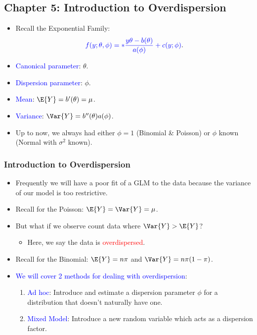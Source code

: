 \documentclass[oneside]{book}\usepackage[]{graphicx}\usepackage[svgnames]{xcolor}
\let\exp\relax%
\begin{document}
\subsection*{Chapter 5: Introduction to Overdispersion}
\begin{itemize}
    \item Recall the Exponential Family:
          \[ \textcolor{Blue}{ f(y;\theta,\phi)=\exp*{\frac{y\theta-b(\theta)}{a(\phi)}+c(y;\phi)} }. \]
    \item \textcolor{Blue}{Canonical parameter}: $ \theta $.
    \item \textcolor{Blue}{Dispersion parameter}: $ \phi $.
    \item \textcolor{Blue}{Mean}: $ \E{Y}=b^\prime(\theta)=\mu $.
    \item \textcolor{Blue}{Variance}: $ \Var{Y}=b^{\prime\prime}(\theta)a(\phi) $.
    \item Up to now, we always had either $ \phi=1 $ (Binomial \& Poisson) or $ \phi $ known (Normal with $ \sigma^2 $ known).
\end{itemize}
\subsubsection*{Introduction to Overdispersion}
\begin{itemize}
    \item Frequently we will have a poor fit of a GLM to the data because the variance of
          our model is too restrictive.
    \item Recall for the Poisson: $ \E{Y}=\Var{Y}=\mu $.
    \item But what if we observe count data where $ \Var{Y}>\E{Y} $?
          \begin{itemize}
              \item Here, we say the data is \textcolor{Red}{overdispersed}.
          \end{itemize}
    \item Recall for the Binomial: $ \E{Y}=n\pi $ and $ \Var{Y}=n\pi(1-\pi) $.
    \item \textcolor{Blue}{We will cover 2 methods for dealing with overdispersion}:
          \begin{enumerate}[1.]
              \item \textcolor{Blue}{Ad hoc}: Introduce and estimate a dispersion parameter $ \phi $ for a distribution that
                    doesn't naturally have one.
              \item \textcolor{Blue}{Mixed Model}: Introduce a new random variable which acts as a dispersion factor.
          \end{enumerate}
\end{itemize}
\end{document}
